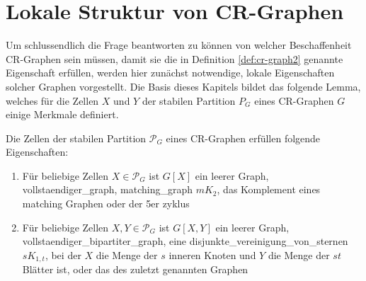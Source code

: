\section{Lokale Struktur von CR-Graphen}
\label{sec/struktur_lokal}


Um schlussendlich die Frage beantworten zu können von welcher Beschaffenheit CR-Graphen sein müssen, damit sie die in Definition \ref{def:cr-graph2} genannte Eigenschaft erfüllen, werden hier zunächst notwendige, lokale Eigenschaften solcher Graphen vorgestellt. Die Basis dieses Kapitels bildet das folgende Lemma, welches für die Zellen $X$ und $Y$ der stabilen Partition $P_G$ eines CR-Graphen $G$ einige Merkmale definiert.

\begin{Lemma}
	Die Zellen der stabilen Partition $\mathcal{P}_G$ eines CR-Graphen erfüllen folgende Eigenschaften:
	
	\begin{enumerate}[label=(\Alph*)]
		\item Für beliebige Zellen $X\in \mathcal{P}_G$ ist $G[X]$ ein leerer Graph, \gls{vollstaendiger_graph}, \gls{matching_graph} $mK_2$, das Komplement eines matching Graphen oder der 5er \gls{zyklus}
		\item Für beliebige Zellen $X,Y\in \mathcal{P}_G$ ist $G[X,Y]$ ein leerer Graph, \gls{vollstaendiger_bipartiter_graph}, eine \gls{disjunkte_vereinigung_von_sternen} $sK_{1,t}$, bei der $X$ die Menge der $s$ inneren Knoten und $Y$ die Menge der $st$ Blätter ist, oder das  des zuletzt genannten Graphen
	\end{enumerate}
\end{Lemma}